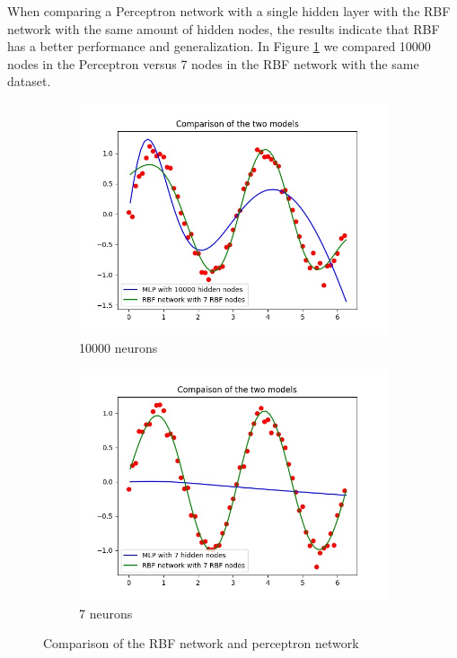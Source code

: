 \documentclass[a4paper]{article}
\begin{document}
When comparing a Perceptron network with a single hidden layer with the RBF network with the same amount of hidden nodes, the results indicate that RBF has a better performance and generalization. In Figure \ref{fig:comp-BRF-perc} we compared 10000 nodes in the Perceptron versus 7 nodes in the RBF network with the same dataset.
\begin{figure}[ht]
    \centering
    \begin{subfigure}{0.4\textwidth}
        \centering
        \includegraphics[width=\textwidth]{Labs/Lab 2/10000.jpg}
        \caption{10000 neurons}
    \end{subfigure}
    \hfill
    \begin{subfigure}{0.4\textwidth}
        \centering
        \includegraphics[width=\textwidth]{Labs/Lab 2/77.jpg}
        \caption{7 neurons}
    \end{subfigure}
    \hfill
    \caption{Comparison of the RBF network and perceptron network }
    \label{fig:comp-BRF-perc}
\end{figure}
\end{document}
